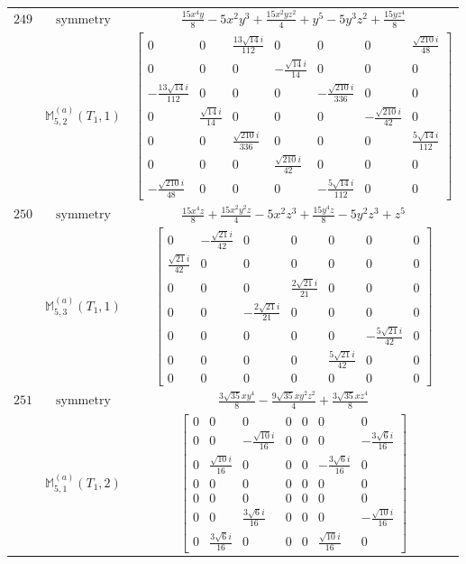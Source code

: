 \documentclass[fleqn,8pt,landscape]{jsarticle}
\begin{document}
\begin{longtable}{ccc}
$ 249 $ & $ \text{symmetry} $ & $ \frac{15 x^{4} y}{8} - 5 x^{2} y^{3} + \frac{15 x^{2} y z^{2}}{4} + y^{5} - 5 y^{3} z^{2} + \frac{15 y z^{4}}{8} $ \\
$  $ & $ \mathbb{M}_{5,2}^{(a)}(T_{1},1) $ & $ \begin{bmatrix} 0 & 0 & \frac{13 \sqrt{14} i}{112} & 0 & 0 & 0 & \frac{\sqrt{210} i}{48} \\ 0 & 0 & 0 & - \frac{\sqrt{14} i}{14} & 0 & 0 & 0 \\ - \frac{13 \sqrt{14} i}{112} & 0 & 0 & 0 & - \frac{\sqrt{210} i}{336} & 0 & 0 \\ 0 & \frac{\sqrt{14} i}{14} & 0 & 0 & 0 & - \frac{\sqrt{210} i}{42} & 0 \\ 0 & 0 & \frac{\sqrt{210} i}{336} & 0 & 0 & 0 & \frac{5 \sqrt{14} i}{112} \\ 0 & 0 & 0 & \frac{\sqrt{210} i}{42} & 0 & 0 & 0 \\ - \frac{\sqrt{210} i}{48} & 0 & 0 & 0 & - \frac{5 \sqrt{14} i}{112} & 0 & 0 \end{bmatrix} $ \\ \hline
$ 250 $ & $ \text{symmetry} $ & $ \frac{15 x^{4} z}{8} + \frac{15 x^{2} y^{2} z}{4} - 5 x^{2} z^{3} + \frac{15 y^{4} z}{8} - 5 y^{2} z^{3} + z^{5} $ \\
$  $ & $ \mathbb{M}_{5,3}^{(a)}(T_{1},1) $ & $ \begin{bmatrix} 0 & - \frac{\sqrt{21} i}{42} & 0 & 0 & 0 & 0 & 0 \\ \frac{\sqrt{21} i}{42} & 0 & 0 & 0 & 0 & 0 & 0 \\ 0 & 0 & 0 & \frac{2 \sqrt{21} i}{21} & 0 & 0 & 0 \\ 0 & 0 & - \frac{2 \sqrt{21} i}{21} & 0 & 0 & 0 & 0 \\ 0 & 0 & 0 & 0 & 0 & - \frac{5 \sqrt{21} i}{42} & 0 \\ 0 & 0 & 0 & 0 & \frac{5 \sqrt{21} i}{42} & 0 & 0 \\ 0 & 0 & 0 & 0 & 0 & 0 & 0 \end{bmatrix} $ \\ \hline
$ 251 $ & $ \text{symmetry} $ & $ \frac{3 \sqrt{35} x y^{4}}{8} - \frac{9 \sqrt{35} x y^{2} z^{2}}{4} + \frac{3 \sqrt{35} x z^{4}}{8} $ \\
$  $ & $ \mathbb{M}_{5,1}^{(a)}(T_{1},2) $ & $ \begin{bmatrix} 0 & 0 & 0 & 0 & 0 & 0 & 0 \\ 0 & 0 & - \frac{\sqrt{10} i}{16} & 0 & 0 & 0 & - \frac{3 \sqrt{6} i}{16} \\ 0 & \frac{\sqrt{10} i}{16} & 0 & 0 & 0 & - \frac{3 \sqrt{6} i}{16} & 0 \\ 0 & 0 & 0 & 0 & 0 & 0 & 0 \\ 0 & 0 & 0 & 0 & 0 & 0 & 0 \\ 0 & 0 & \frac{3 \sqrt{6} i}{16} & 0 & 0 & 0 & - \frac{\sqrt{10} i}{16} \\ 0 & \frac{3 \sqrt{6} i}{16} & 0 & 0 & 0 & \frac{\sqrt{10} i}{16} & 0 \end{bmatrix} $ \\ \hline

\end{longtable}
\end{document}
